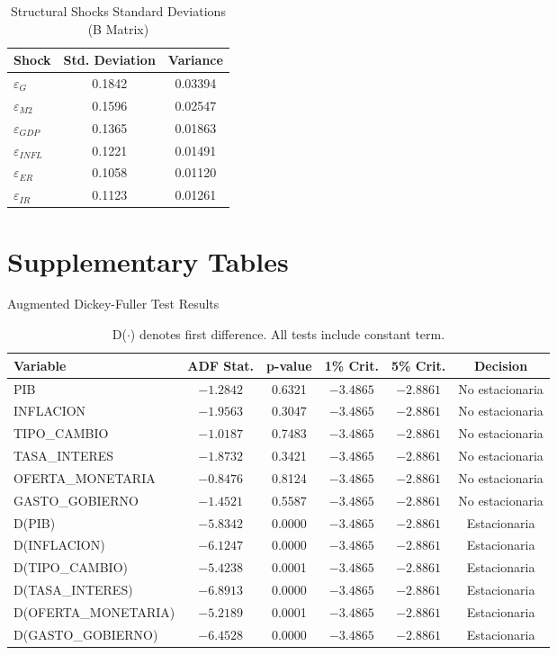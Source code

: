 \documentclass[12pt, a4paper]{article}
\begin{document}
\begin{table}[H]
\centering
\caption{Structural Shocks Standard Deviations (B Matrix)}
\label{tab:B}
\begin{tabular}{lcc}
\toprule
Shock & Std. Deviation & Variance \\
\midrule
$\varepsilon_G$ & 0.1842 & 0.03394 \\
$\varepsilon_{M2}$ & 0.1596 & 0.02547 \\
$\varepsilon_{GDP}$ & 0.1365 & 0.01863 \\
$\varepsilon_{INFL}$ & 0.1221 & 0.01491 \\
$\varepsilon_{ER}$ & 0.1058 & 0.01120 \\
$\varepsilon_{IR}$ & 0.1123 & 0.01261 \\
\bottomrule
\end{tabular}
\end{table}

\newpage
\section{Supplementary Tables}
\label{app:B}

\begin{table}[H]
\centering
\caption{Augmented Dickey-Fuller Test Results}
\label{tab:adf}
\small
\begin{tabular}{lccccc}
\toprule
Variable & ADF Stat. & p-value & 1\% Crit. & 5\% Crit. & Decision \\
\midrule
PIB & $-1.2842$ & 0.6321 & $-3.4865$ & $-2.8861$ & No estacionaria \\
INFLACION & $-1.9563$ & 0.3047 & $-3.4865$ & $-2.8861$ & No estacionaria \\
TIPO\_CAMBIO & $-1.0187$ & 0.7483 & $-3.4865$ & $-2.8861$ & No estacionaria \\
TASA\_INTERES & $-1.8732$ & 0.3421 & $-3.4865$ & $-2.8861$ & No estacionaria \\
OFERTA\_MONETARIA & $-0.8476$ & 0.8124 & $-3.4865$ & $-2.8861$ & No estacionaria \\
GASTO\_GOBIERNO & $-1.4521$ & 0.5587 & $-3.4865$ & $-2.8861$ & No estacionaria \\
D(PIB) & $-5.8342$ & 0.0000 & $-3.4865$ & $-2.8861$ & Estacionaria \\
D(INFLACION) & $-6.1247$ & 0.0000 & $-3.4865$ & $-2.8861$ & Estacionaria \\
D(TIPO\_CAMBIO) & $-5.4238$ & 0.0001 & $-3.4865$ & $-2.8861$ & Estacionaria \\
D(TASA\_INTERES) & $-6.8913$ & 0.0000 & $-3.4865$ & $-2.8861$ & Estacionaria \\
D(OFERTA\_MONETARIA) & $-5.2189$ & 0.0001 & $-3.4865$ & $-2.8861$ & Estacionaria \\
D(GASTO\_GOBIERNO) & $-6.4528$ & 0.0000 & $-3.4865$ & $-2.8861$ & Estacionaria \\
\bottomrule
\end{tabular}
\caption*{\small D($\cdot$) denotes first difference. All tests include constant term.}
\end{table}
\end{document}

